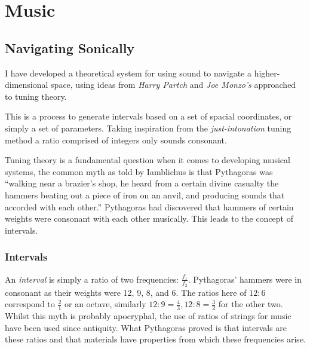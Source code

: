\chapter{Music}
\label{Music}
\section{Navigating Sonically}
\label{sonicnav}
I have developed a theoretical system for using sound to navigate a
higher-dimensional space, using ideas from \emph{Harry Partch} and \emph{Joe
Monzo's} approached to tuning theory.

This is a process to generate intervals based on a set of spacial coordinates,
or simply a set of parameters. Taking inspiration from the
\emph{just-intonation} tuning method a ratio comprised of integers only sounds
consonant.

Tuning theory is a fundamental question when it comes to developing musical
systems, the common myth as told by Iamblichus is that Pythagoras was ``walking
near a brazier's shop, he heard from a certain divine casualty the hammers
beating out a piece of iron on an anvil, and producing sounds that accorded with
each other.'' \citep[p.62]{iamblichus} Pythagoras had discovered that hammers of
certain weights were consonant with each other musically. This leads to the
concept of intervals.

\subsection{Intervals}
An \emph{interval} is simply a ratio of two frequencies: $\frac{f_1}{f_2}$.
Pythagoras' hammers were in consonant as their weights were 12, 9, 8, and 6.
The ratios here of $12:6$ correspond to $\frac{2}{1}$ or an octave, similarly
$12:9 = \frac{4}{3}, 12:8 = \frac{3}{2}$ for the other two. Whilst this myth is
probably apocryphal, the use of ratios of strings for music have been used since
antiquity. What Pythagoras proved is that intervals are these ratios and that
materials have properties from which these frequencies arise.

